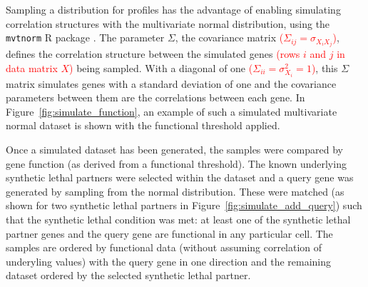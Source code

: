 Sampling a distribution for  profiles has the advantage of enabling simulating correlation structures with the multivariate normal distribution, using the \texttt{mvtnorm} R package \citep{Genz2009, mvtnorm}. The parameter $\Sigma$, the covariance matrix \textcolor{red}{($\Sigma_{ij} = \sigma_{X_iX_j}$)}, defines the correlation structure between the simulated genes \textcolor{red}{(rows $i$ and $j$ in data matrix $X$)} being sampled. With a diagonal of one \textcolor{red}{($\Sigma_{ii} = \sigma^{2}_{X_i}= 1$)}, this $\Sigma$ matrix simulates genes with a standard deviation of one and the covariance parameters between them are the correlations between each gene. In Figure~\ref{fig:simulate_function}, an example of such a simulated multivariate normal dataset is shown with the functional threshold applied.

Once a simulated dataset has been generated, the samples were compared by gene function (as derived from a functional threshold). The known underlying \gls{synthetic lethal} partners were selected within the dataset and a query gene was generated by sampling from the normal distribution. These were matched (as shown for two \gls{synthetic lethal} partners in Figure~\ref{fig:simulate_add_query}) such that the \gls{synthetic lethal} condition was met: at least one of the \gls{synthetic lethal} partner genes and the query gene are functional in any particular cell. The samples are ordered by functional data (without assuming correlation of underyling  values) with the query gene in one direction and the remaining dataset ordered by the selected \gls{synthetic lethal} partner.


